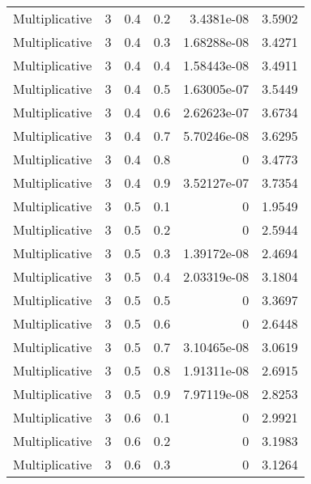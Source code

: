 \documentclass{article}
\begin{document}
\begin{longtable}[H]{lrrrrr}
 Multiplicative &       3 &   0.4 &            0.2 &      3.4381e-08  &          3.5902 \\
 Multiplicative &       3 &   0.4 &            0.3 &      1.68288e-08 &          3.4271 \\
 Multiplicative &       3 &   0.4 &            0.4 &      1.58443e-08 &          3.4911 \\
 Multiplicative &       3 &   0.4 &            0.5 &      1.63005e-07 &          3.5449 \\
 Multiplicative &       3 &   0.4 &            0.6 &      2.62623e-07 &          3.6734 \\
 Multiplicative &       3 &   0.4 &            0.7 &      5.70246e-08 &          3.6295 \\
 Multiplicative &       3 &   0.4 &            0.8 &      0           &          3.4773 \\
 Multiplicative &       3 &   0.4 &            0.9 &      3.52127e-07 &          3.7354 \\
 Multiplicative &       3 &   0.5 &            0.1 &      0           &          1.9549 \\
 Multiplicative &       3 &   0.5 &            0.2 &      0           &          2.5944 \\
 Multiplicative &       3 &   0.5 &            0.3 &      1.39172e-08 &          2.4694 \\
 Multiplicative &       3 &   0.5 &            0.4 &      2.03319e-08 &          3.1804 \\
 Multiplicative &       3 &   0.5 &            0.5 &      0           &          3.3697 \\
 Multiplicative &       3 &   0.5 &            0.6 &      0           &          2.6448 \\
 Multiplicative &       3 &   0.5 &            0.7 &      3.10465e-08 &          3.0619 \\
 Multiplicative &       3 &   0.5 &            0.8 &      1.91311e-08 &          2.6915 \\
 Multiplicative &       3 &   0.5 &            0.9 &      7.97119e-08 &          2.8253 \\
 Multiplicative &       3 &   0.6 &            0.1 &      0           &          2.9921 \\
 Multiplicative &       3 &   0.6 &            0.2 &      0           &          3.1983 \\
 Multiplicative &       3 &   0.6 &            0.3 &      0           &          3.1264 \\

\end{longtable}
\end{document}
